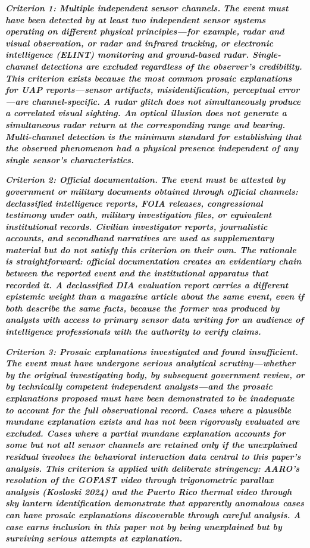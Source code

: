 \documentclass[11pt,letterpaper]{article}
\begin{document}
\textbf{\textit{Criterion 1: Multiple independent sensor channels.}}\textbf{\textit{ The event must have been detected by at least two independent sensor systems operating on different physical principles---for example, radar and visual observation, or radar and infrared tracking, or electronic intelligence (ELINT) monitoring and ground-based radar. Single-channel detections are excluded regardless of the observer's credibility. This criterion exists because the most common prosaic explanations for UAP reports---sensor artifacts, misidentification, perceptual error---are channel-specific. A radar glitch does not simultaneously produce a correlated visual sighting. An optical illusion does not generate a simultaneous radar return at the corresponding range and bearing. Multi-channel detection is the minimum standard for establishing that the observed phenomenon had a physical presence independent of any single sensor's characteristics.}}


\textbf{\textit{Criterion 2: Official documentation.}}\textbf{\textit{ The event must be attested by government or military documents obtained through official channels: declassified intelligence reports, FOIA releases, congressional testimony under oath, military investigation files, or equivalent institutional records. Civilian investigator reports, journalistic accounts, and secondhand narratives are used as supplementary material but do not satisfy this criterion on their own. The rationale is straightforward: official documentation creates an evidentiary chain between the reported event and the institutional apparatus that recorded it. A declassified DIA evaluation report carries a different epistemic weight than a magazine article about the same event, even if both describe the same facts, because the former was produced by analysts with access to primary sensor data writing for an audience of intelligence professionals with the authority to verify claims.}}


\textbf{\textit{Criterion 3: Prosaic explanations investigated and found insufficient.}}\textbf{\textit{ The event must have undergone serious analytical scrutiny---whether by the original investigating body, by subsequent government review, or by technically competent independent analysts---and the prosaic explanations proposed must have been demonstrated to be inadequate to account for the full observational record. Cases where a plausible mundane explanation exists and has not been rigorously evaluated are excluded. Cases where a partial mundane explanation accounts for some but not all sensor channels are retained only if the unexplained residual involves the behavioral interaction data central to this paper's analysis. This criterion is applied with deliberate stringency: AARO's resolution of the GOFAST video through trigonometric parallax analysis (Kosloski 2024) and the Puerto Rico thermal video through sky lantern identification demonstrate that apparently anomalous cases can have prosaic explanations discoverable through careful analysis. A case earns inclusion in this paper not by being unexplained but by surviving serious attempts at explanation.}}
\end{document}
